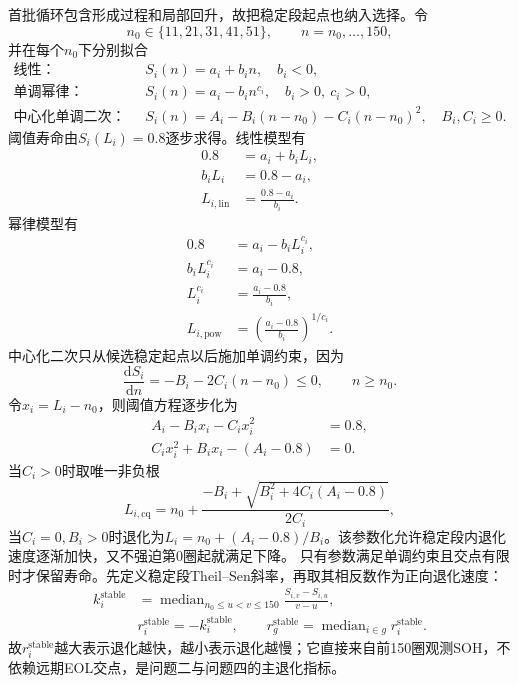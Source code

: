 \documentclass[withoutpreface]{cumcmthesis}
\begin{document}
首批循环包含形成过程和局部回升，故把稳定段起点也纳入选择。令
\[
n_0\in\{11,21,31,41,51\},\qquad n=n_0,\ldots,150,
\]
并在每个$n_0$下分别拟合
\begin{align}
\text{线性：}\quad &S_i(n)=a_i+b_i n,\quad b_i<0,\\
\text{单调幂律：}\quad &S_i(n)=a_i-b_i n^{c_i},\quad b_i>0,\ c_i>0,\\
\text{中心化单调二次：}\quad
&S_i(n)=A_i-B_i(n-n_0)-C_i(n-n_0)^2,\quad B_i,C_i\ge0.
\end{align}
阈值寿命由$S_i(L_i)=0.8$逐步求得。线性模型有
\begin{align}
0.8&=a_i+b_iL_i,\\
b_iL_i&=0.8-a_i,\\
L_{i,\mathrm{lin}}&=\frac{0.8-a_i}{b_i}.
\end{align}
幂律模型有
\begin{align}
0.8&=a_i-b_iL_i^{c_i},\\
b_iL_i^{c_i}&=a_i-0.8,\\
L_i^{c_i}&=\frac{a_i-0.8}{b_i},\\
L_{i,\mathrm{pow}}&=\left(\frac{a_i-0.8}{b_i}\right)^{1/c_i}.
\end{align}
中心化二次只从候选稳定起点以后施加单调约束，因为
\begin{equation}
\frac{\mathrm dS_i}{\mathrm dn}=-B_i-2C_i(n-n_0)\le0,\qquad n\ge n_0.
\end{equation}
令$x_i=L_i-n_0$，则阈值方程逐步化为
\begin{align}
A_i-B_ix_i-C_ix_i^2&=0.8,\\
C_ix_i^2+B_ix_i-(A_i-0.8)&=0.
\end{align}
当$C_i>0$时取唯一非负根
\begin{equation}
\boxed{L_{i,\mathrm{cq}}=n_0+
\frac{-B_i+\sqrt{B_i^2+4C_i(A_i-0.8)}}{2C_i}},
\end{equation}
当$C_i=0,B_i>0$时退化为$L_i=n_0+(A_i-0.8)/B_i$。该参数化允许稳定段内退化速度逐渐加快，又不强迫第0圈起就满足下降。
只有参数满足单调约束且交点有限时才保留寿命。先定义稳定段Theil--Sen斜率，再取其相反数作为正向退化速度：
\begin{align}
k_i^{\mathrm{stable}}
&=\operatorname{median}_{n_0\le u<v\le150}
\frac{S_{i,v}-S_{i,u}}{v-u},\\
&\boxed{r_i^{\mathrm{stable}}=-k_i^{\mathrm{stable}}},\qquad
r_g^{\mathrm{stable}}=\operatorname{median}_{i\in g}r_i^{\mathrm{stable}}.
\end{align}
故$r_i^{\mathrm{stable}}$越大表示退化越快，越小表示退化越慢；它直接来自前150圈观测SOH，不依赖远期EOL交点，是问题二与问题四的主退化指标。
\end{document}
